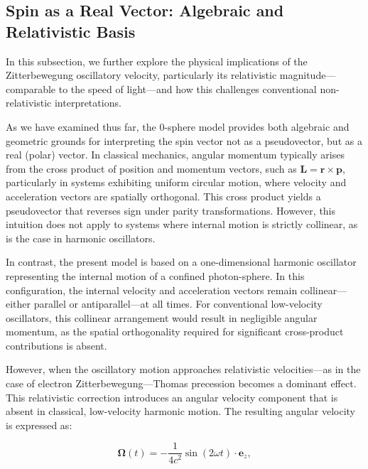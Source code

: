 \documentclass[%
 reprint,
 amsmath,amssymb,
 aps,
]{revtex4-1}
\numberwithin{equation}{section}%
\begin{document}
\subsection{Spin as a Real Vector: Algebraic and Relativistic Basis}

In this subsection, we further explore the physical implications of the Zitterbewegung oscillatory velocity, particularly its relativistic magnitude—comparable to the speed of light—and how this challenges conventional non-relativistic interpretations.

As we have examined thus far, the 0-sphere model provides both algebraic and geometric grounds for interpreting the spin vector not as a pseudovector, but as a real (polar) vector. In classical mechanics, angular momentum typically arises from the cross product of position and momentum vectors, such as $\boldsymbol{L} = \boldsymbol{r} \times \boldsymbol{p}$, particularly in systems exhibiting uniform circular motion, where velocity and acceleration vectors are spatially orthogonal. This cross product yields a pseudovector that reverses sign under parity transformations. However, this intuition does not apply to systems where internal motion is strictly collinear, as is the case in harmonic oscillators.

In contrast, the present model is based on a one-dimensional harmonic oscillator representing the internal motion of a confined photon-sphere. In this configuration, the internal velocity and acceleration vectors remain collinear—either parallel or antiparallel—at all times. For conventional low-velocity oscillators, this collinear arrangement would result in negligible angular momentum, as the spatial orthogonality required for significant cross-product contributions is absent.

However, when the oscillatory motion approaches relativistic velocities—as in the case of electron Zitterbewegung—Thomas precession becomes a dominant effect. This relativistic correction introduces an angular velocity component that is absent in classical, low-velocity harmonic motion. The resulting angular velocity is expressed as:

\begin{equation}
    \boldsymbol{\Omega}(t) = -\frac{1}{4c^2} \sin(2\omega t) \cdot \boldsymbol{e}_z,
    \label{eq:angular_velocity}
\end{equation}
\end{document}
